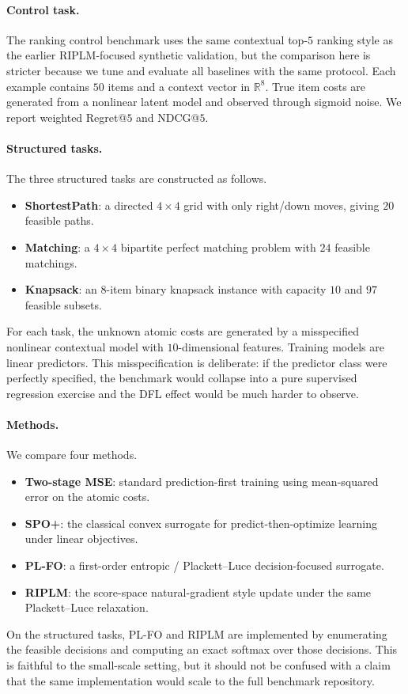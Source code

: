 \documentclass[11pt]{article}
\begin{document}
\paragraph{Control task.}
The ranking control benchmark uses the same contextual top-$5$ ranking style as the earlier RIPLM-focused synthetic validation, but the comparison here is stricter because we tune and evaluate all baselines with the same protocol. Each example contains $50$ items and a context vector in $\mathbb{R}^8$. True item costs are generated from a nonlinear latent model and observed through sigmoid noise. We report weighted Regret@$5$ and NDCG@$5$.

\paragraph{Structured tasks.}
The three structured tasks are constructed as follows.
\begin{itemize}
    \item \textbf{ShortestPath}: a directed $4\times 4$ grid with only right/down moves, giving $20$ feasible paths.
    \item \textbf{Matching}: a $4\times 4$ bipartite perfect matching problem with $24$ feasible matchings.
    \item \textbf{Knapsack}: an $8$-item binary knapsack instance with capacity $10$ and $97$ feasible subsets.
\end{itemize}
For each task, the unknown atomic costs are generated by a misspecified nonlinear contextual model with $10$-dimensional features. Training models are linear predictors. This misspecification is deliberate: if the predictor class were perfectly specified, the benchmark would collapse into a pure supervised regression exercise and the DFL effect would be much harder to observe.

\paragraph{Methods.}
We compare four methods.
\begin{itemize}
    \item \textbf{Two-stage MSE}: standard prediction-first training using mean-squared error on the atomic costs.
    \item \textbf{SPO+}: the classical convex surrogate for predict-then-optimize learning under linear objectives.
    \item \textbf{PL-FO}: a first-order entropic / Plackett--Luce decision-focused surrogate.
    \item \textbf{RIPLM}: the score-space natural-gradient style update under the same Plackett--Luce relaxation.
\end{itemize}
On the structured tasks, PL-FO and RIPLM are implemented by enumerating the feasible decisions and computing an exact softmax over those decisions. This is faithful to the small-scale setting, but it should not be confused with a claim that the same implementation would scale to the full benchmark repository.
\end{document}
